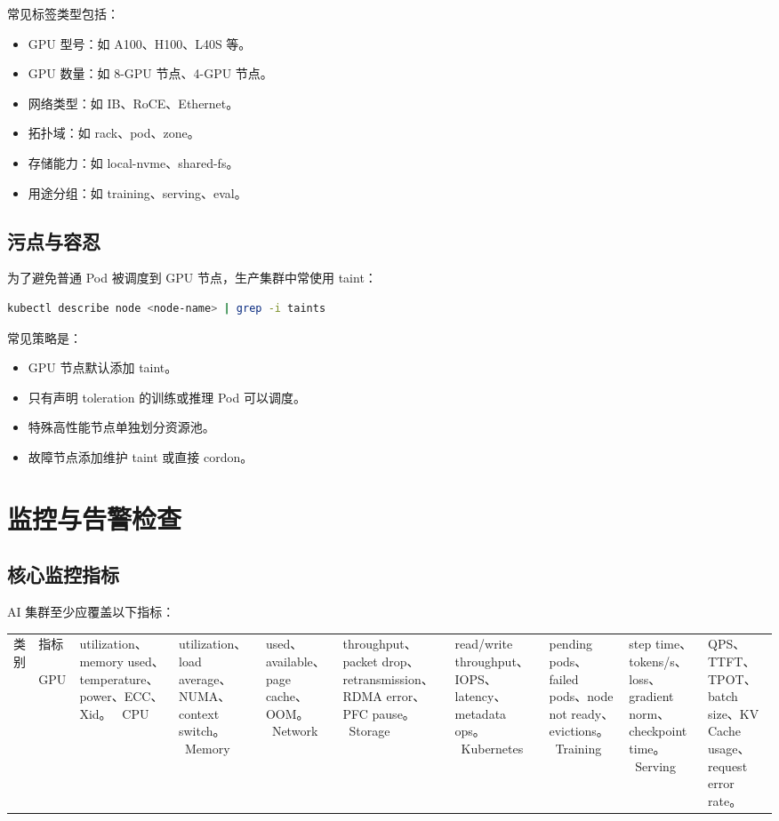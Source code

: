 常见标签类型包括：

\begin{itemize}
\item GPU 型号：如 A100、H100、L40S 等。
\item GPU 数量：如 8-GPU 节点、4-GPU 节点。
\item 网络类型：如 IB、RoCE、Ethernet。
\item 拓扑域：如 rack、pod、zone。
\item 存储能力：如 local-nvme、shared-fs。
\item 用途分组：如 training、serving、eval。
\end{itemize}

\subsection{污点与容忍}

为了避免普通 Pod 被调度到 GPU 节点，生产集群中常使用 taint：

\begin{lstlisting}[language=bash,caption={查看节点污点},label={lst:k8s-taints}]
kubectl describe node <node-name> | grep -i taints
\end{lstlisting}

常见策略是：

\begin{itemize}
\item GPU 节点默认添加 taint。
\item 只有声明 toleration 的训练或推理 Pod 可以调度。
\item 特殊高性能节点单独划分资源池。
\item 故障节点添加维护 taint 或直接 cordon。
\end{itemize}

\section{监控与告警检查}

\subsection{核心监控指标}

AI 集群至少应覆盖以下指标：

\begin{longtable}{p{}p{}}
\toprule
类别 & 指标 \
\midrule
GPU & utilization、memory used、temperature、power、ECC、Xid。 \
CPU & utilization、load average、NUMA、context switch。 \
Memory & used、available、page cache、OOM。 \
Network & throughput、packet drop、retransmission、RDMA error、PFC pause。 \
Storage & read/write throughput、IOPS、latency、metadata ops。 \
Kubernetes & pending pods、failed pods、node not ready、evictions。 \
Training & step time、tokens/s、loss、gradient norm、checkpoint time。 \
Serving & QPS、TTFT、TPOT、batch size、KV Cache usage、request error rate。 \
\bottomrule
\end{longtable}

